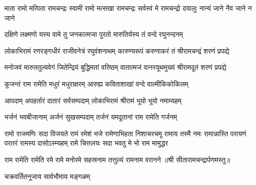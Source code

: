 \fourlineindentedshloka
{माता रामो मत्पिता रामचन्द्रः}
{स्वामी रामो मत्सखा रामचन्द्रः}
{सर्वस्वं मे रामचन्द्रो दयालुः}
{नान्यं जाने नैव जाने न जाने}

\twolineshloka
{दक्षिणे लक्ष्मणो यस्य वामे तु जनकात्मजा}
{पुरतो मारुतिर्यस्य तं वन्दे रघुनन्दनम्}

\twolineshloka
{लोकाभिरामं रणरङ्गधीरं राजीवनेत्रं रघुवंशनाथम्}
{कारुण्यरूपं करुणाकरं तं श्रीरामचन्द्रं शरणं प्रपद्ये}

\twolineshloka
{मनोजवं मारुततुल्यवेगं जितेन्द्रियं बुद्धिमतां वरिष्ठम्}
{वातात्मजं वानरयूथमुख्यं श्रीरामदूतं शरणं प्रपद्ये}

\twolineshloka
{कूजन्तं राम रामेति मधुरं मधुराक्षरम्}
{आरुह्य कविताशाखां वन्दे वाल्मीकिकोकिलम्}

\twolineshloka
{आपदाम् अपहर्तारं दातारं सर्वसम्पदाम्}
{लोकाभिरामं श्रीरामं भूयो भूयो नमाम्यहम्}

\twolineshloka
{भर्जनं भवबीजानाम् अर्जनं सुखसम्पदाम्}
{तर्जनं यमदूतानां राम रामेति गर्जनम्}

\fourlineindentedshloka
{रामो राजमणिः सदा विजयते रामं रमेशं भजे}
{रामेणाभिहता निशाचरचमू रामाय तस्मै नमः}
{रामान्नास्ति परायणं परतरं रामस्य दासोऽस्म्यहम्}
{रामे चित्तलयः सदा भवतु मे भो राम मामुद्धर}

\twolineshloka
{राम रामेति रामेति रमे रामे मनोरमे}
{सहस्रनाम तत्तुल्यं रामनाम वरानने}
॥श्री सीतारामचन्द्रार्पणमस्तु॥

\closesection
{}
{चक्रवर्तितनूजाय सार्वभौमाय मङ्गळम्}